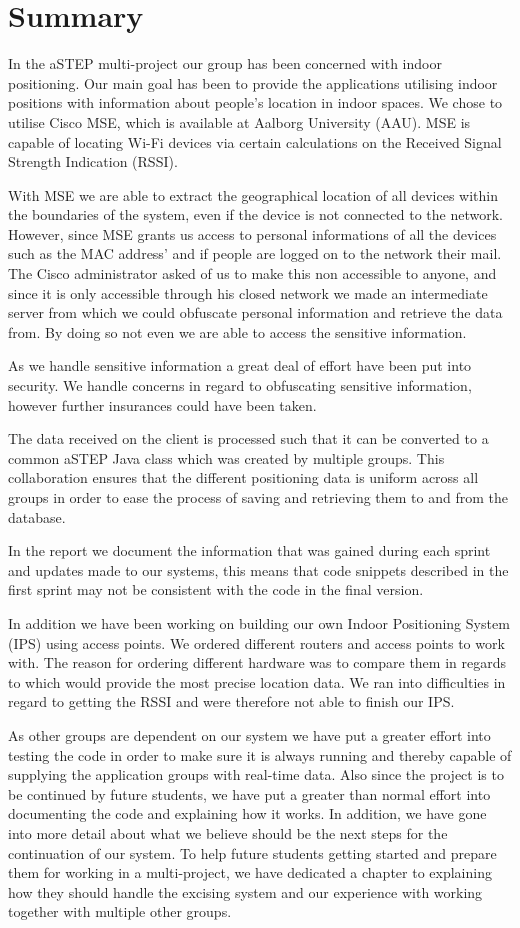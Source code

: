 \chapter*{Summary}
In the aSTEP multi-project our group has been concerned with indoor positioning. Our main goal has been to provide the applications utilising indoor positions with information about people's location in indoor spaces. We chose to utilise Cisco MSE, which is available at Aalborg University (AAU). MSE is capable of locating Wi-Fi devices via certain calculations on the Received Signal Strength Indication (RSSI).

With MSE we are able to extract the geographical location of all devices within the boundaries of the system, even if the device is not connected to the network. However, since MSE grants us access to personal informations of all the devices such as the MAC address' and if people are logged on to the network their mail. The Cisco administrator asked of us to make this non accessible to anyone, and since it is only accessible through his closed network we made an intermediate server from which we could obfuscate personal information and retrieve the data from. By doing so not even we are able to access the sensitive information. 

As we handle sensitive information a great deal of effort have been put into security. We handle concerns in regard to obfuscating sensitive information, however further insurances could have been taken.

The data received on the client is processed such that it can be converted to a common aSTEP Java class which was created by multiple groups. This collaboration ensures that the different positioning data is uniform across all groups in order to ease the process of saving and retrieving them to and from the database.

In the report we document the information that was gained during each sprint and updates made to our systems, this means that code snippets described in the first sprint may not be consistent with the code in the final version.

In addition we have been working on building our own Indoor Positioning System (IPS) using access points. We ordered different routers and access points to work with. The reason for ordering different hardware was to compare them in regards to which would provide the most precise location data. We ran into difficulties in regard to getting the RSSI and were therefore not able to finish our IPS.

As other groups are dependent on our system we have put a greater effort into testing the code in order to make sure it is always running and thereby capable of supplying the application groups with real-time data.
Also since the project is to be continued by future students, we have put a greater than normal effort into documenting the code and explaining how it works. In addition, we have gone into more detail about what we believe should be the next steps for the continuation of our system.
To help future students getting started and prepare them for working in a multi-project, we have dedicated a chapter to explaining how they should handle the excising system and our experience with working together with multiple other groups. 